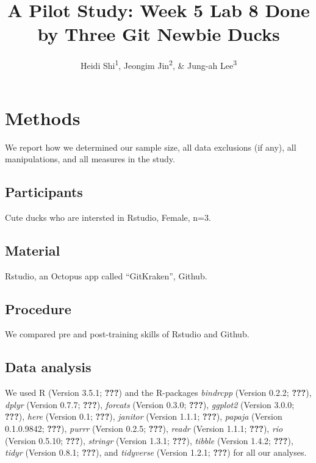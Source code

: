 \documentclass[man]{apa6}
\title{A Pilot Study: Week 5 Lab 8 Done by Three Git Newbie Ducks}
\author{Heidi Shi\textsuperscript{1}, Jeongim Jin\textsuperscript{2}, \& Jung-ah
Lee\textsuperscript{3}}
\date{}
\affiliation{
\vspace{0.5cm}
\textsuperscript{1} University of Oregon\\\textsuperscript{2} University of Oregon\\\textsuperscript{3} University of Oregon}
\begin{document}
\maketitle

\section{Methods}\label{methods}

We report how we determined our sample size, all data exclusions (if
any), all manipulations, and all measures in the study.

\subsection{Participants}\label{participants}

Cute ducks who are intersted in Rstudio, Female, n=3.

\subsection{Material}\label{material}

Rstudio, an Octopus app called \enquote{GitKraken}, Github.

\subsection{Procedure}\label{procedure}

We compared pre and post-training skills of Rstudio and Github.

\subsection{Data analysis}\label{data-analysis}

We used R (Version 3.5.1; {\textbf{???}}) and the R-packages
\emph{bindrcpp} (Version 0.2.2; {\textbf{???}}), \emph{dplyr} (Version
0.7.7; {\textbf{???}}), \emph{forcats} (Version 0.3.0; {\textbf{???}}),
\emph{ggplot2} (Version 3.0.0; {\textbf{???}}), \emph{here} (Version
0.1; {\textbf{???}}), \emph{janitor} (Version 1.1.1; {\textbf{???}}),
\emph{papaja} (Version 0.1.0.9842; {\textbf{???}}), \emph{purrr}
(Version 0.2.5; {\textbf{???}}), \emph{readr} (Version 1.1.1;
{\textbf{???}}), \emph{rio} (Version 0.5.10; {\textbf{???}}),
\emph{stringr} (Version 1.3.1; {\textbf{???}}), \emph{tibble} (Version
1.4.2; {\textbf{???}}), \emph{tidyr} (Version 0.8.1; {\textbf{???}}),
and \emph{tidyverse} (Version 1.2.1; {\textbf{???}}) for all our
analyses.
\end{document}
